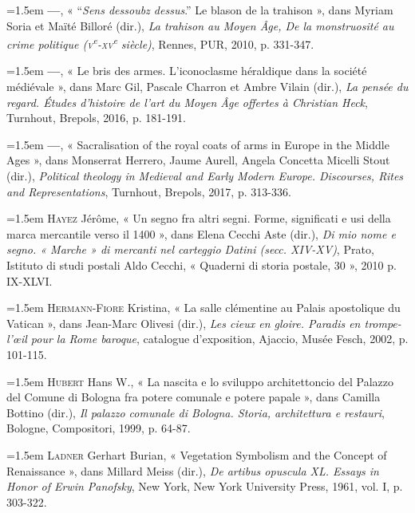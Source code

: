 \documentclass[12pt,twoside,openany]{book}
\newenvironment{PurhBibliography}
  {%
    \par
    \setlength{\parindent}{0pt}%
    \setlength{\leftskip}{0pt}%
  }
  {%
    \par
  }
\begin{document}
\begin{PurhBibliography}
\noindent\hangindent=1.5em \textbf{—}, « “\textit{Sens dessoubz dessus}.” Le blason de la trahison », dans Myriam Soria et Maïté Billoré (dir.), \textit{La trahison au Moyen Âge, De la monstruosité au crime politique (}\textit{\textsc{v}}\textit{\textsuperscript{e}}\textit{-}\textit{\textsc{xv}}\textit{\textsuperscript{e}}\textit{ siècle)}, Rennes, PUR, 2010, p. 331-347.\par
\noindent\hangindent=1.5em \textbf{—}, « Le bris des armes. L’iconoclasme héraldique dans la société médiévale », dans Marc Gil, Pascale Charron et Ambre Vilain (dir.), \textit{La pensée du regard. Études d’histoire de l’art du Moyen Âge offertes à Christian Heck}, Turnhout, Brepols, 2016, p. 181-191.\par
\noindent\hangindent=1.5em \textbf{—}, « Sacralisation of the royal coats of arms in Europe in the Middle Ages », dans Monserrat Herrero, Jaume Aurell, Angela Concetta Micelli Stout (dir.), \textit{Political theology in Medieval and Early Modern Europe. Discourses, Rites and Representations}, Turnhout, Brepols, 2017, p. 313-336.\par
\noindent\hangindent=1.5em \textsc{Hayez} Jérôme, « Un segno fra altri segni. Forme, significati e usi della marca mercantile verso il 1400 », dans Elena Cecchi Aste (dir.), \textit{Di mio nome e segno. « Marche » di mercanti nel carteggio Datini (secc. XIV-XV)}, Prato, Istituto di studi postali Aldo Cecchi, « Quaderni di storia postale, 30 », 2010 p. \textsc{IX}-\textsc{XLVI}.\par
\noindent\hangindent=1.5em \textsc{Hermann}-\textsc{Fiore} Kristina, « La salle clémentine au Palais apostolique du Vatican », dans Jean-Marc Olivesi (dir.), \textit{Les cieux en gloire. Paradis en trompe-l’œil pour la Rome baroque}, catalogue d’exposition, Ajaccio, Musée Fesch, 2002, p. 101-115.\par
\noindent\hangindent=1.5em \textsc{Hubert} Hans W., « La nascita e lo sviluppo architettoncio del Palazzo del Comune di Bologna fra potere comunale e potere papale », dans Camilla Bottino (dir.), \textit{Il palazzo comunale di Bologna. Storia, architettura e restauri}, Bologne, Compositori, 1999, p. 64-87.\par
\noindent\hangindent=1.5em \textsc{Ladner} Gerhart Burian, « Vegetation Symbolism and the Concept of Renaissance », dans Millard Meiss (dir.), \textit{De artibus opuscula XL. Essays in Honor of Erwin Panofsky}, New York, New York University Press, 1961, vol. I, p. 303-322. \par

\end{PurhBibliography}
\end{document}
